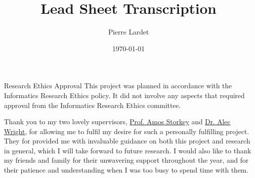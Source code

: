 \documentclass[logo,bsc,singlespacing,parskip,online]{infthesis}
\begin{document}
\begin{preliminary}

\title{Lead Sheet Transcription}

\author{Pierre Lardet}





\date{\today}


\maketitle

\newenvironment{ethics}
   {\begin{frontenv}{Research Ethics Approval}{\LARGE}}
   {\end{frontenv}\newpage}

\begin{ethics}
This project was planned in accordance with the Informatics Research
Ethics policy. It did not involve any aspects that required approval
from the Informatics Research Ethics committee.

\standarddeclaration
\end{ethics}


\begin{acknowledgements}
Thank you to my two lovely supervisors, \hyperlink{https://homepages.inf.ed.ac.uk/amos/index.html}{Prof. Amos Storkey} and \hyperlink{https://www.acoustics.ed.ac.uk/people/dr-alec-wright/}{Dr. Alec Wright}, for allowing me to fulfil my desire for such a personally fulfilling project. They for provided me with invaluable guidance on both this project and research in general, which I will take forward to future research. I would also like to thank my friends and family for their unwavering support throughout the year, and for their patience and understanding when I was too busy to spend time with them.
\end{acknowledgements}


\tableofcontents
\end{preliminary}
\end{document}
